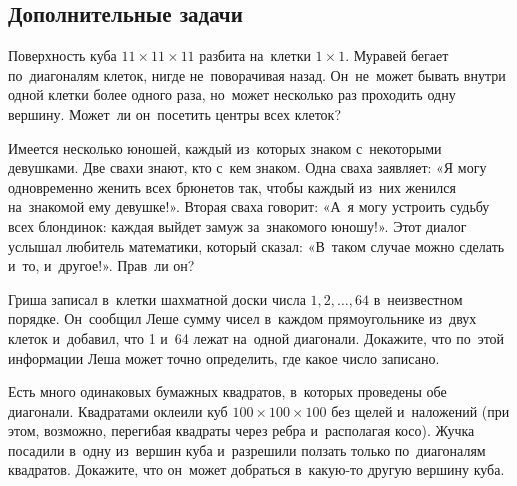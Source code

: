 

\subsection*{Дополнительные задачи}



\begin{problems}

\item
Поверхность куба $11 \times 11 \times 11$ разбита на~клетки $1 \times 1$.
Муравей бегает по~диагоналям клеток, нигде не~поворачивая назад.
Он~не~может бывать внутри одной клетки более одного раза, но~может несколько
раз проходить одну вершину.
Может~ли он~посетить центры всех клеток?

\item
Имеется несколько юношей, каждый из~которых знаком с~некоторыми девушками.
Две свахи знают, кто с~кем знаком.
Одна сваха заявляет:
«Я могу одновременно женить всех брюнетов так, чтобы каждый из~них женился
на~знакомой ему девушке!».
Вторая сваха говорит:
«А~я могу устроить судьбу всех блондинок: каждая выйдет замуж за~знакомого
юношу!».
Этот диалог услышал любитель математики, который сказал:
«В~таком случае можно сделать и~то, и~другое!».
Прав~ли он?

\item
Гриша записал в~клетки шахматной доски числа $1, 2, \ldots, 64$ в~неизвестном
порядке.
Он~сообщил Леше сумму чисел в~каждом прямоугольнике из~двух клеток и~добавил,
что 1 и~64 лежат на~одной диагонали.
Докажите, что по~этой информации Леша может точно определить, где какое число
записано.

\item
Есть много одинаковых бумажных квадратов, в~которых проведены обе диагонали.
Квадратами оклеили куб $100 \times 100 \times 100$ без щелей и~наложений
(при этом, возможно, перегибая квадраты через ребра и~располагая косо).
Жучка посадили в~одну из~вершин куба и~разрешили ползать только по~диагоналям
квадратов.
Докажите, что он~может добраться в~какую-то другую вершину куба.

\end{problems}

